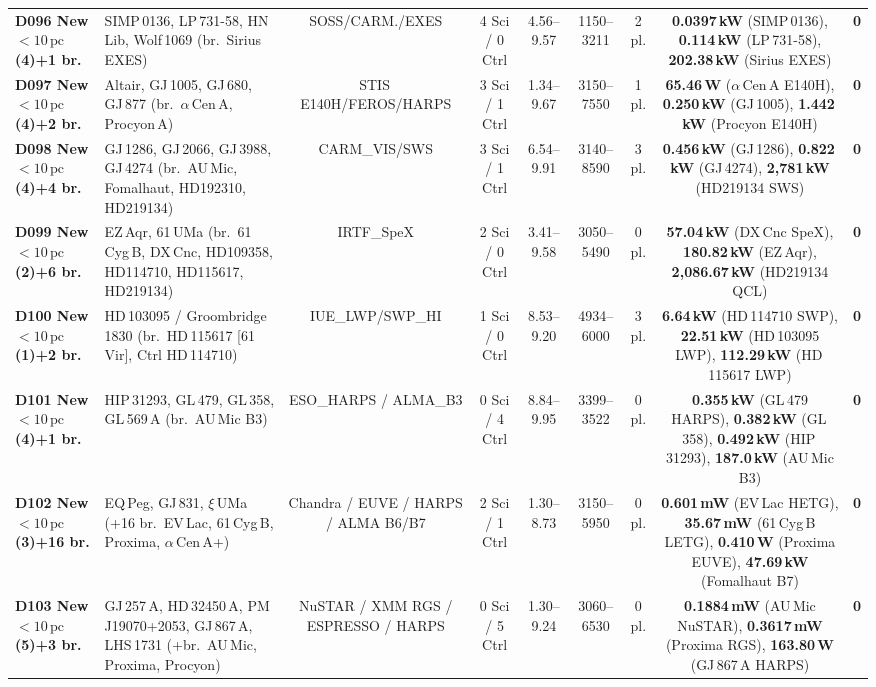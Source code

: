 \documentclass[twocolumn,10pt]{article}
\begin{document}
\begin{table}[p]
{\begin{tabular}{llccccccc}
\textbf{D096 New $<10\,\text{pc}$ (4)+1 br.} & SIMP\,0136, LP\,731-58, HN\,Lib, Wolf\,1069 (br.\ Sirius EXES) & SOSS/CARM./EXES & 4 Sci / 0 Ctrl & 4.56--9.57 & 1150--3211 & 2 pl. & \textbf{0.0397\,kW} (SIMP\,0136), \textbf{0.114\,kW} (LP\,731-58), \textbf{202.38\,kW} (Sirius EXES) & \textbf{0} \\
\textbf{D097 New $<10\,\text{pc}$ (4)+2 br.} & Altair, GJ\,1005, GJ\,680, GJ\,877 (br.\ $\alpha$\,Cen\,A, Procyon\,A) & STIS\,E140H/FEROS/HARPS & 3 Sci / 1 Ctrl & 1.34--9.67 & 3150--7550 & 1 pl. & \textbf{65.46\,W} ($\alpha$\,Cen\,A E140H), \textbf{0.250\,kW} (GJ\,1005), \textbf{1.442\,kW} (Procyon E140H) & \textbf{0} \\
\textbf{D098 New $<10\,\text{pc}$ (4)+4 br.} & GJ\,1286, GJ\,2066, GJ\,3988, GJ\,4274 (br.\ AU\,Mic, Fomalhaut, HD192310, HD219134) & CARM\_VIS/SWS & 3 Sci / 1 Ctrl & 6.54--9.91 & 3140--8590 & 3 pl. & \textbf{0.456\,kW} (GJ\,1286), \textbf{0.822\,kW} (GJ\,4274), \textbf{2,781\,kW} (HD219134 SWS) & \textbf{0} \\
\textbf{D099 New $<10\,\text{pc}$ (2)+6 br.} & EZ\,Aqr, 61\,UMa (br.\ 61\,Cyg\,B, DX\,Cnc, HD109358, HD114710, HD115617, HD219134) & IRTF\_SpeX & 2 Sci / 0 Ctrl & 3.41--9.58 & 3050--5490 & 0 pl. & \textbf{57.04\,kW} (DX\,Cnc SpeX), \textbf{180.82\,kW} (EZ\,Aqr), \textbf{2,086.67\,kW} (HD219134 QCL) & \textbf{0} \\
\textbf{D100 New $<10\,\text{pc}$ (1)+2 br.} & HD\,103095 / Groombridge\,1830 (br.\ HD\,115617 [61\,Vir], Ctrl HD\,114710) & IUE\_LWP/SWP\_HI & 1 Sci / 0 Ctrl & 8.53--9.20 & 4934--6000 & 3 pl. & \textbf{6.64\,kW} (HD\,114710 SWP), \textbf{22.51\,kW} (HD\,103095 LWP), \textbf{112.29\,kW} (HD\,115617 LWP) & \textbf{0} \\
\textbf{D101 New $<10\,\text{pc}$ (4)+1 br.} & HIP\,31293, GL\,479, GL\,358, GL\,569\,A (br.\ AU\,Mic B3) & ESO\_HARPS / ALMA\_B3 & 0 Sci / 4 Ctrl & 8.84--9.95 & 3399--3522 & 0 pl. & \textbf{0.355\,kW} (GL\,479 HARPS), \textbf{0.382\,kW} (GL\,358), \textbf{0.492\,kW} (HIP\,31293), \textbf{187.0\,kW} (AU\,Mic B3) & \textbf{0} \\
\textbf{D102 New $<10\,\text{pc}$ (3)+16 br.} & EQ\,Peg, GJ\,831, $\xi$\,UMa (+16 br.\ EV\,Lac, 61\,Cyg\,B, Proxima, $\alpha$\,Cen\,A+) & Chandra / EUVE / HARPS / ALMA B6/B7 & 2 Sci / 1 Ctrl & 1.30--8.73 & 3150--5950 & 0 pl. & \textbf{0.601\,mW} (EV\,Lac HETG), \textbf{35.67\,mW} (61\,Cyg\,B LETG), \textbf{0.410\,W} (Proxima EUVE), \textbf{47.69\,kW} (Fomalhaut B7) & \textbf{0} \\
\textbf{D103 New $<10\,\text{pc}$ (5)+3 br.} & GJ\,257\,A, HD\,32450\,A, PM\,J19070+2053, GJ\,867\,A, LHS\,1731 (+br.\ AU\,Mic, Proxima, Procyon) & NuSTAR / XMM RGS / ESPRESSO / HARPS & 0 Sci / 5 Ctrl & 1.30--9.24 & 3060--6530 & 0 pl. & \textbf{0.1884\,mW} (AU\,Mic NuSTAR), \textbf{0.3617\,mW} (Proxima RGS), \textbf{163.80\,W} (GJ\,867\,A HARPS) & \textbf{0} \\

\end{tabular}}
\end{table}
\end{document}
